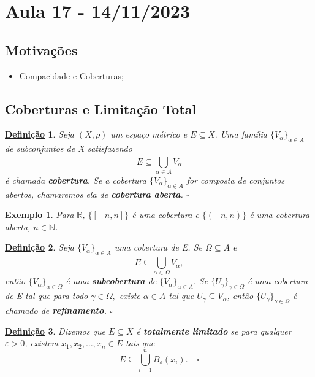 \documentclass{article}
\newtheorem*{def*}{\underline{Defini\c c\~ao}}
\newtheorem{example}{\underline{Exemplo}}
\begin{document}
\section{Aula 17 - 14/11/2023}
\subsection{Motivações} 
\begin{itemize}
  \item Compacidade e Coberturas;
\end{itemize}
\subsection{Coberturas e Limitação Total}
\begin{def*}
  Seja \((X, \rho )\) um espaço métrico e \(E\subseteq{X}.\) Uma família \(\{V_{\alpha }\}_{\alpha \in A}\) de subconjuntos de X satisfazendo 
  \[
    E \subseteq \bigcup_{\alpha \in A}^{}{V_{\alpha }}
  \]
  é chamada \textbf{cobertura}. Se a cobertura \(\{V_{\alpha }\}_{\alpha \in A}\) for composta de conjuntos abertos, chamaremos ela de \textbf{cobertura aberta}. \(\square\)
\end{def*}
\begin{example}
  Para \(\mathbb{R}\), \(\{[-n, n]\}\) é uma cobertura e \(\{(-n, n)\}\) é uma cobertura aberta, \(n\in \mathbb{N}\).
\end{example}
\begin{def*}
  Seja \(\{V_{\alpha }\}_{\alpha \in A}\) uma cobertura de E. Se \(\Omega \subseteq{A}\) e 
  \[
    E \subseteq{\bigcup_{\alpha \in \Omega }^{}{V_{\alpha }}},
  \]
então \(\{V_{\alpha }\}_{\alpha \in \Omega }\) é uma \textbf{subcobertura} de \(\{V_{\alpha }\}_{\alpha \in A}.\) Se \(\{U_{\gamma }\}_{\gamma \in \Omega }\) é uma cobertura 
de E tal que para todo \(\gamma \in \Omega, \) existe \(\alpha \in A\) tal que \(U_{\gamma }\subseteq{V_{\alpha }}\), então \(\{U_{\gamma }\}_{\gamma \in\Omega }\)
é chamado de \textbf{refinamento.} \(\square\)
\end{def*}
\begin{def*}
  Dizemos que \(E\subseteq{X}\) é \textbf{totalmente limitado} se para qualquer \(\varepsilon > 0\), existem \(x_{1}, x_{2}, \dotsc, x_{n}\in E\) tais que 
  \[
    E \subseteq{\bigcup_{i=1}^{n}{B_{\varepsilon }(x_{i})}}.\quad\square
  \]
\end{def*}
\end{document}
